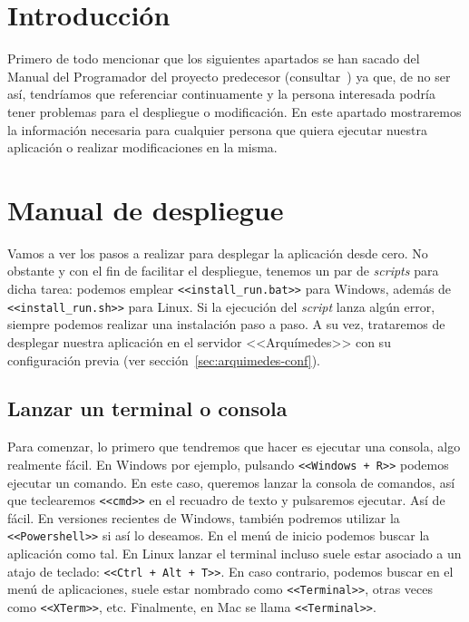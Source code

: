 
\section{Introducción}

Primero de todo mencionar que los siguientes apartados se han sacado del Manual del Programador del proyecto predecesor (consultar~\cite{github:alberto-viewer}) ya que, de no ser así, tendríamos que referenciar continuamente y la persona interesada podría tener problemas para el despliegue o modificación.
En este apartado mostraremos la información necesaria para cualquier persona que quiera ejecutar nuestra aplicación o realizar modificaciones en la misma.

\section{Manual de despliegue}\label{manual-despliegue}
Vamos a ver los pasos a realizar para desplegar la aplicación desde cero. No obstante y con el fin de facilitar el despliegue, tenemos un par de \textit{scripts} para dicha tarea: 
podemos emplear \texttt{<<install\_run.bat>>} para Windows, además de \texttt{<<install\_run.sh>>} para Linux. Si la ejecución del \textit{script} lanza algún error, siempre podemos realizar una instalación paso a paso. A su vez, trataremos de desplegar nuestra aplicación en el servidor <<Arquímedes>> con su configuración previa (ver sección~\ref{sec:arquimedes-conf}).

\subsection{Lanzar un terminal o consola}
Para comenzar, lo primero que tendremos que hacer es ejecutar una consola, algo realmente fácil. En Windows por ejemplo, pulsando \texttt{<<Windows + R>>} podemos ejecutar un comando. En este caso, queremos lanzar la consola de comandos, así que teclearemos \texttt{<<cmd>>} en el recuadro de texto y pulsaremos ejecutar. Así de fácil.
En versiones recientes de Windows, también podremos utilizar la \texttt{<<Powershell>>} si así lo deseamos. En el menú de inicio podemos buscar la aplicación como tal.
En Linux lanzar el terminal incluso suele estar asociado a un atajo de teclado: \texttt{<<Ctrl + Alt + T>>}. En caso contrario, podemos buscar en el menú de aplicaciones, suele estar nombrado como \texttt{<<Terminal>>}, otras veces como \texttt{<<XTerm>>}, etc.
Finalmente, en Mac se llama \texttt{<<Terminal>>}.

